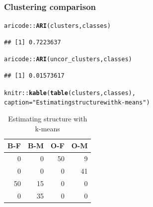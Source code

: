 \documentclass{beamer}\usepackage[]{graphicx}\usepackage[]{color}
\makeatletter
\newcommand{\hlstr}[1]{\textcolor[rgb]{0.192,0.494,0.8}{#1}}%
\newcommand{\hlopt}[1]{\textcolor[rgb]{0,0,0}{#1}}%
\newcommand{\hlstd}[1]{\textcolor[rgb]{0.345,0.345,0.345}{#1}}%
\newcommand{\hlkwc}[1]{\textcolor[rgb]{0.333,0.667,0.333}{#1}}%
\newcommand{\hlkwd}[1]{\textcolor[rgb]{0.737,0.353,0.396}{\textbf{#1}}}%
\newenvironment{kframe}{%
 \def\at@end@of@kframe{}%
 \ifinner\ifhmode%
  \def\at@end@of@kframe{\end{minipage}}%
  \begin{minipage}{\columnwidth}%
 \fi\fi%
 \def\FrameCommand##1{\hskip\@totalleftmargin \hskip-\fboxsep
 \colorbox{shadecolor}{##1}\hskip-\fboxsep
     \hskip-\linewidth \hskip-\@totalleftmargin \hskip\columnwidth}%
 \MakeFramed {\advance\hsize-\width
   \@totalleftmargin\z@ \linewidth\hsize
   \@setminipage}}%
 {\par\unskip\endMakeFramed%
 \at@end@of@kframe}
\newenvironment{knitrout}{}{} %
\makeatother
\begin{document}
% 

\begin{frame}[fragile]
  \frametitle{Clustering comparison}

\begin{knitrout}\scriptsize
{}\color{fgcolor}\begin{kframe}
\begin{alltt}
\hlstd{aricode}\hlopt{::}\hlkwd{ARI}\hlstd{(clusters, classes)}
\end{alltt}
\begin{verbatim}
## [1] 0.7223637
\end{verbatim}
\begin{alltt}
\hlstd{aricode}\hlopt{::}\hlkwd{ARI}\hlstd{(uncor_clusters, classes)}
\end{alltt}
\begin{verbatim}
## [1] 0.01573617
\end{verbatim}
\end{kframe}
\end{knitrout}

\begin{knitrout}\scriptsize
{}\color{fgcolor}\begin{kframe}
\begin{alltt}
\hlstd{knitr}\hlopt{::}\hlkwd{kable}\hlstd{(}\hlkwd{table}\hlstd{(clusters, classes),}
\hlkwc{caption} \hlstd{=} \hlstr{"Estimating structure with k-means"}\hlstd{)}
\end{alltt}
\end{kframe}\begin{table}[t]

\caption{\label{tab:contingency_table_kmeans}Estimating structure with k-means}
\centering
\begin{tabular}{r|r|r|r}
\hline
B-F & B-M & O-F & O-M\\
\hline
0 & 0 & 50 & 9\\
\hline
0 & 0 & 0 & 41\\
\hline
50 & 15 & 0 & 0\\
\hline
0 & 35 & 0 & 0\\
\hline
\end{tabular}
\end{table}


\end{knitrout}

\end{frame}
\end{document}
